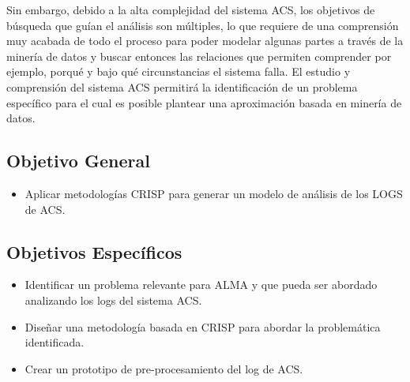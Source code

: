 Sin embargo, debido a la alta complejidad del sistema ACS, los objetivos de búsqueda que guían el análisis son múltiples, lo que requiere de una comprensión muy acabada de todo el proceso para poder modelar algunas partes a través de la minería de datos y buscar entonces las relaciones que permiten comprender por ejemplo, porqué y bajo qué circunstancias el sistema falla. El estudio y comprensión del sistema ACS permitirá la identificación de un problema específico para el cual es posible plantear una aproximación basada en minería de datos.



\newpage

 
\subsection{Objetivo General}

\begin{itemize}
	\item Aplicar metodologías CRISP para generar un modelo de análisis de los LOGS de ACS.
\end{itemize}


\subsection{Objetivos Específicos}
\begin{itemize}	
	\item Identificar un problema relevante para ALMA y que pueda ser abordado analizando los logs del sistema ACS.
	\item Diseñar una metodología basada en CRISP para abordar la problemática identificada.
	\item Crear un prototipo de pre-procesamiento del log de ACS.
\end{itemize}



